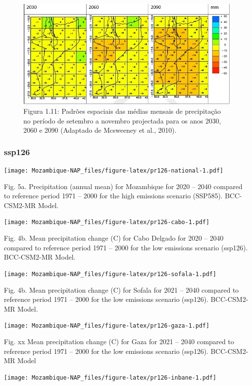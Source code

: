 \documentclass[
]{book}
\begin{document}
\begin{figure}
\centering
\includegraphics{images/padroes especiais.png}
\caption{Figura 1.11: Padrões espaciais das médias mensais de precipitação no período de setembro a novembro projectada para os anos 2030, 2060 e 2090 (Adaptado de Mcsweeney et al., 2010).}
\end{figure}

\hypertarget{ssp126}{%
\subsubsection{ssp126}\label{ssp126}}

\texttt{[image: Mozambique-NAP\_files/figure-latex/pr126-national-1.pdf]}

Fig. 5a. Precipitation (annual mean) for Mozambique for 2020 -- 2040 compared to reference period 1971 -- 2000 for the high emissions scenario (SSP585). BCC-CSM2-MR Model.

\texttt{[image: Mozambique-NAP\_files/figure-latex/pr126-cabo-1.pdf]}

Fig. 4b. Mean precipitation change (C) for Cabo Delgado for 2020 -- 2040 compared to reference period 1971 -- 2000 for the low emissions scenario (ssp126). BCC-CSM2-MR Model.

\texttt{[image: Mozambique-NAP\_files/figure-latex/pr126-sofala-1.pdf]}

Fig. 4b. Mean precipitation change (C) for Sofala for 2021 -- 2040 compared to reference period 1971 -- 2000 for the low emissions scenario (ssp126). BCC-CSM2-MR Model.

\texttt{[image: Mozambique-NAP\_files/figure-latex/pr126-gaza-1.pdf]}

Fig. xx Mean precipitation change (C) for Gaza for 2021 -- 2040 compared to reference period 1971 -- 2000 for the low emissions scenario (ssp126). BCC-CSM2-MR Model

\texttt{[image: Mozambique-NAP\_files/figure-latex/pr126-inbane-1.pdf]}
\end{document}
